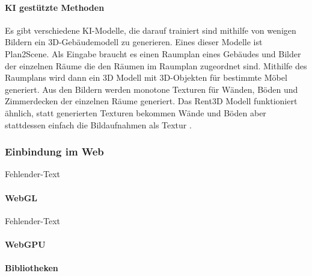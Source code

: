 \paragraph{KI gestützte Methoden}
Es gibt verschiedene KI-Modelle, die darauf trainiert sind mithilfe von wenigen Bildern ein 3D-Gebäudemodell zu generieren. Eines dieser Modelle ist Plan2Scene. Als Eingabe braucht es einen Raumplan eines Gebäudes und Bilder der einzelnen Räume die den Räumen im Raumplan zugeordnet sind. Mithilfe des Raumplans wird dann ein 3D Modell mit 3D-Objekten für bestimmte Möbel generiert. Aus den Bildern werden monotone Texturen für Wänden, Böden und Zimmerdecken der einzelnen Räume generiert.\cite[S.~10733]{Plan2Scene2021} Das Rent3D Modell funktioniert ähnlich, statt generierten Texturen bekommen Wände und Böden aber stattdessen einfach die Bildaufnahmen als Textur \cite[S.~3413]{Rent3D2015}.

\subsubsection{Einbindung im Web}
Fehlender-Text

\paragraph{WebGL}
Fehlender-Text

\paragraph{WebGPU}

\paragraph{Bibliotheken}

